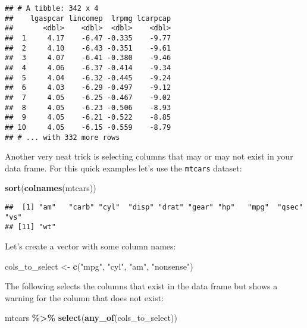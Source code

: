 \documentclass[
]{article}
\newenvironment{Shaded}{\begin{snugshade}}{\end{snugshade}}
\newcommand{\KeywordTok}[1]{\textcolor[rgb]{0.13,0.29,0.53}{\textbf{#1}}}
\newcommand{\NormalTok}[1]{#1}
\newcommand{\OperatorTok}[1]{\textcolor[rgb]{0.81,0.36,0.00}{\textbf{#1}}}
\newcommand{\StringTok}[1]{\textcolor[rgb]{0.31,0.60,0.02}{#1}}
\begin{document}
\begin{verbatim}
## # A tibble: 342 x 4
##    lgaspcar lincomep  lrpmg lcarpcap
##       <dbl>    <dbl>  <dbl>    <dbl>
##  1     4.17    -6.47 -0.335    -9.77
##  2     4.10    -6.43 -0.351    -9.61
##  3     4.07    -6.41 -0.380    -9.46
##  4     4.06    -6.37 -0.414    -9.34
##  5     4.04    -6.32 -0.445    -9.24
##  6     4.03    -6.29 -0.497    -9.12
##  7     4.05    -6.25 -0.467    -9.02
##  8     4.05    -6.23 -0.506    -8.93
##  9     4.05    -6.21 -0.522    -8.85
## 10     4.05    -6.15 -0.559    -8.79
## # ... with 332 more rows
\end{verbatim}

Another very neat trick is selecting columns that may or may not exist in your data frame. For this quick examples
let's use the \texttt{mtcars} dataset:

\begin{Shaded}
\begin{Highlighting}[]
\KeywordTok{sort}\NormalTok{(}\KeywordTok{colnames}\NormalTok{(mtcars))}
\end{Highlighting}
\end{Shaded}

\begin{verbatim}
##  [1] "am"   "carb" "cyl"  "disp" "drat" "gear" "hp"   "mpg"  "qsec" "vs"  
## [11] "wt"
\end{verbatim}

Let's create a vector with some column names:

\begin{Shaded}
\begin{Highlighting}[]
\NormalTok{cols\_to\_select \textless{}{-}}\StringTok{ }\KeywordTok{c}\NormalTok{(}\StringTok{"mpg"}\NormalTok{, }\StringTok{"cyl"}\NormalTok{, }\StringTok{"am"}\NormalTok{, }\StringTok{"nonsense"}\NormalTok{)}
\end{Highlighting}
\end{Shaded}

The following selects the columns that exist
in the data frame but shows a warning for the column that does not exist:

\begin{Shaded}
\begin{Highlighting}[]
\NormalTok{mtcars }\OperatorTok{\%\textgreater{}\%}
\StringTok{  }\KeywordTok{select}\NormalTok{(}\KeywordTok{any\_of}\NormalTok{(cols\_to\_select))}
\end{Highlighting}
\end{Shaded}
\end{document}
